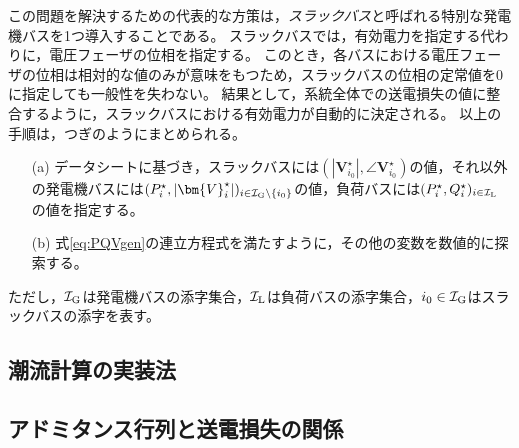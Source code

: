 \documentclass[tombow,dvipdfmx]{corona-a5-1.1}
\begin{document}
この問題を解決するための代表的な方策は，\emph{スラックバス}と呼ばれる特別な発電機バスを1つ導入することである。
スラックバスでは，有効電力を指定する代わりに，電圧フェーザの位相を指定する。
このとき，各バスにおける電圧フェーザの位相は相対的な値のみが意味をもつため，スラックバスの位相の定常値を0に指定しても一般性を失わない。
結果として，系統全体での送電損失の値に整合するように，スラックバスにおける有効電力が自動的に決定される。
以上の手順は，つぎのようにまとめられる。
\begin{itemize}
\item[(a)] データシートに基づき，スラックバスには$(|\bm{V}_{i_0}^{\star}|,\angle \bm{V}_{i_0}^{\star})$の値，それ以外の発電機バスには$(P_i^{\star},|\bm{V}_{i}^{\star}|)_{i \in \mathcal{I}_{\rm G}\setminus\{i_0\} }$の値，負荷バスには$(P_i^{\star},Q_i^{\star})_{i \in \mathcal{I}_{\rm L}}$の値を指定する。
\item[(b)] 式\ref{eq:PQVgen}の連立方程式を満たすように，その他の変数を数値的に探索する。
\end{itemize}
ただし，$\mathcal{I}_{\rm G}$は発電機バスの添字集合，$\mathcal{I}_{\rm L}$は負荷バスの添字集合，$i_0 \in \mathcal{I}_{\rm G}$はスラックバスの添字を表す。


\begin{例}[データシートに基づく潮流計算]
\end{例}



\begin{例}[経済性を考慮した潮流計算]\label{ex:pflow}
\end{例}


\subsection{潮流計算の実装法}


\subsection{アドミタンス行列と送電損失の関係\advanced}
\end{document}
